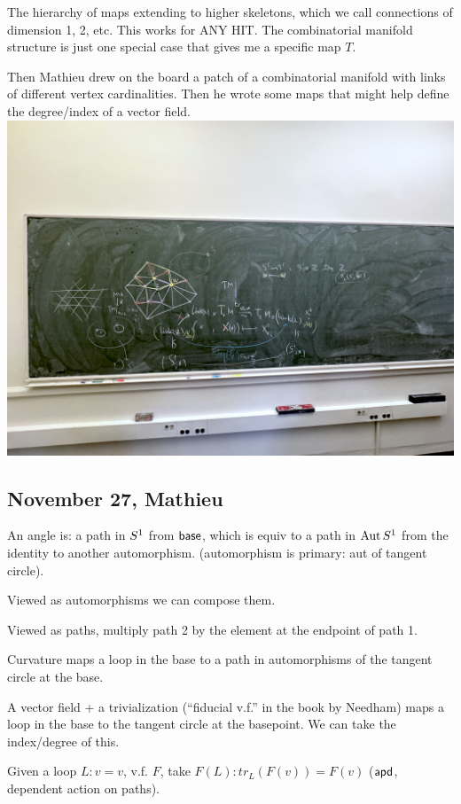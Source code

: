 \documentclass[12pt,fleqn]{article}
\begin{document}
The hierarchy of maps extending to higher skeletons, which we call connections of dimension 1, 2, etc. This works for ANY HIT. The combinatorial manifold structure is just one special case that gives me a specific map \( T \).

Then Mathieu drew on the board a patch of a combinatorial manifold with links of different vertex cardinalities. Then he wrote some maps that might help define the degree/index of a vector field.
\includegraphics[width=400pt]{board2024.jpg}

\subsection{November 27, Mathieu}

An angle is: a path in \( S^1 \) from \( \mathsf{base} \), which is equiv to a path in \( \operatorname{Aut}S^1 \) from the identity to another automorphism. (automorphism is primary: aut of tangent circle).

Viewed as automorphisms we can compose them.

Viewed as paths, multiply path 2 by the element at the endpoint of path 1.

Curvature maps a loop in the base to a path in automorphisms of the tangent circle at the base.

A vector field + a trivialization (``fiducial v.f.'' in the book by Needham) maps a loop in the base to the tangent circle at the basepoint. We can take the index/degree of this.

Given a loop \( L:v=v \), v.f. \( F \), take \( F(L):tr_L(F(v))=F(v) \) (\( \mathsf{apd} \), dependent action on paths).
\end{document}
